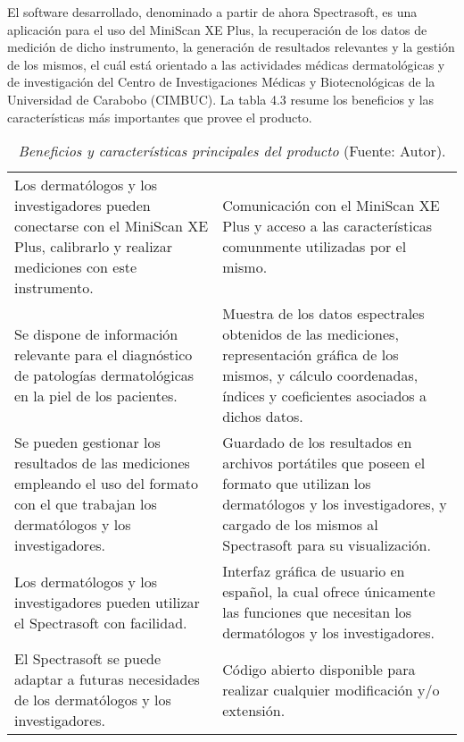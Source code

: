 	El software desarrollado, denominado a partir de ahora Spectrasoft, es una aplicaci\'{o}n para el uso del MiniScan XE Plus, la recuperaci\'{o}n de los datos de medici\'{o}n de dicho instrumento, la generaci\'{o}n de resultados relevantes y la gesti\'{o}n de los mismos, el cu\'{a}l est\'{a} orientado a las actividades m\'{e}dicas dermatol\'{o}gicas y de investigaci\'{o}n del Centro de Investigaciones M\'{e}dicas y Biotecnol\'{o}gicas de la Universidad de Carabobo (CIMBUC). La tabla 4.3 resume los beneficios y las caracter\'{i}sticas m\'{a}s importantes que provee el producto.
	
	\begin{table}[h]
		\small
		\caption[Beneficios y caracter\'{i}sticas principales del producto]{\textit{Beneficios y caracter\'{i}sticas principales del producto} (Fuente: Autor).}
		\centering
		\setlength{\extrarowheight}{\altocelda}
		\begin{tabulary}{\anchotabla}{|J|J|}
			\hline
			 & \\ \hline
			Los dermat\'{o}logos y los investigadores pueden conectarse con el MiniScan XE Plus, calibrarlo y realizar mediciones con este instrumento. & 
			Comunicaci\'{o}n con el MiniScan XE Plus y acceso a las caracter\'{i}sticas comunmente utilizadas por el mismo.\\ \hline
			Se dispone de informaci\'{o}n relevante para el diagn\'{o}stico de patolog\'{i}as dermatol\'{o}gicas en la piel de los pacientes. &
			Muestra de los datos espectrales obtenidos de las mediciones, representaci\'{o}n gr\'{a}fica de los mismos, y c\'{a}lculo coordenadas, \'{i}ndices y coeficientes asociados a dichos datos.\\ \hline
			Se pueden gestionar los resultados de las mediciones empleando el uso del formato con el que trabajan los dermat\'{o}logos y los investigadores. &
			Guardado de los resultados en archivos port\'{a}tiles que poseen el formato que utilizan los dermat\'{o}logos y los investigadores, y cargado de los mismos al Spectrasoft para su visualizaci\'{o}n.\\ \hline
			Los dermat\'{o}logos y los investigadores pueden utilizar el Spectrasoft con facilidad. &
			Interfaz gr\'{a}fica de usuario en espa\~{n}ol, la cual ofrece \'{u}nicamente las funciones que necesitan los dermat\'{o}logos y los investigadores.\\ \hline
			El Spectrasoft se puede adaptar a futuras necesidades de los dermat\'{o}logos y los investigadores. &
			C\'{o}digo abierto disponible para realizar cualquier modificaci\'{o}n y/o extensi\'{o}n.\\ \hline
		\end{tabulary}
	\end{table}
	
